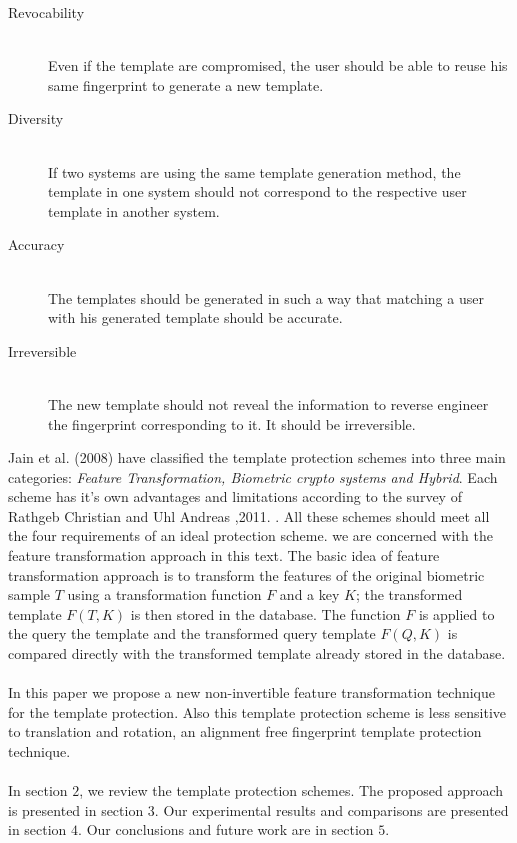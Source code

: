 \documentclass[14pt, oneside]{article}   	%
\begin{document}
\begin{description}
  \item[Revocability] \hfill \\
  Even if the template are compromised, the user should be able to reuse his same fingerprint to generate a new template.
  \item[Diversity] \hfill \\
  If two systems are using the same template generation method, the template in one system should not correspond to the respective user template in another system.
  \item[Accuracy] \hfill \\
  The templates should be generated in such a way that matching a user with his generated template should be accurate.
  \item[Irreversible]\hfill \\
  The new template should not reveal the information to reverse engineer the fingerprint corresponding to it. It should be irreversible.
\end{description}

Jain et al. (2008) have classified the template protection schemes into three main categories: \textit{Feature Transformation, Biometric crypto systems and Hybrid}.  Each scheme has it's own advantages and limitations according to the survey of Rathgeb Christian and Uhl Andreas ,2011. \cite{2}. All these schemes should meet all the four requirements of an ideal protection scheme. we are concerned with the feature transformation approach in this text.  The basic idea of feature transformation approach is to transform the features of the original biometric sample \textbf{$T$} using a transformation function \textbf{$F$} and a key \textbf{$K$}; the transformed template \textbf{$F(T,K)$} is then stored in the database. The function \textbf{$F$} is applied to the query the template and the transformed query template \textbf{$F(Q,K)$} is compared directly with the transformed template already stored in the database. 
\paragraph{}
In this paper we propose a new non-invertible feature transformation technique for the template protection. Also this template protection scheme is less sensitive to translation and rotation, an alignment free fingerprint template protection technique. 
\paragraph{}
In section $2$, we review the template protection schemes. The proposed approach is presented in section 3. Our experimental results and comparisons are presented in section $4$. Our conclusions and future work are in section $5$.
\end{document}
